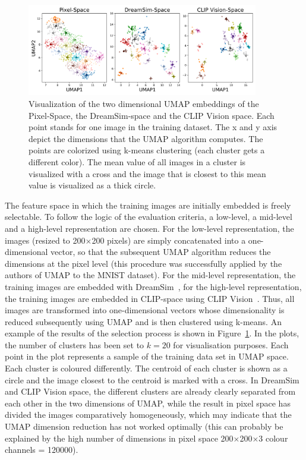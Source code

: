 \begin{figure}[ht]
    \centering
    \includegraphics[width=0.9\textwidth]{plots/dropout_umap.png}
    \caption[UMAP visualization of diversity based subsampling]{Visualization of the two dimensional UMAP embeddings of the Pixel-Space, the DreamSim-space and the CLIP Vision space. Each point stands for one image in the training dataset. The x and y axis depict the dimensions that the UMAP algorithm computes. The points are colorized using k-means clustering (each cluster gets a different color). The mean value of all images in a cluster is visualized with a cross and the image that is closest to this mean value is visualized as a thick circle.}\label{fig:dropout_umap}
\end{figure}


The feature space in which the training images are initially embedded is freely selectable. To follow the logic of the evaluation criteria, a low-level, a mid-level and a high-level representation are chosen. For the low-level representation, the images (resized to 200$\times$200 pixels) are simply concatenated into a one-dimensional vector, so that the subsequent UMAP algorithm reduces the dimensions at the pixel level (this procedure was successfully applied by the authors of UMAP to the MNIST dataset). For the mid-level representation, the training images are embedded with DreamSim~\cite{fuDreamSimLearningNew2023}, for the high-level representation, the training images are embedded in CLIP-space using CLIP Vision~\cite{radfordLearningTransferableVisual2021}. Thus, all images are transformed into one-dimensional vectors whose dimensionality is reduced subsequently using UMAP and is then clustered using k-means. 
An example of the results of the selection process is shown in Figure~\ref{fig:dropout_umap}. In the plots, the number of clusters has been set to $k=20$ for visualisation purposes. Each point in the plot represents a sample of the training data set in UMAP space. Each cluster is coloured differently. The centroid of each cluster is shown as a circle and the image closest to the centroid is marked with a cross. In DreamSim and CLIP Vision space, the different clusters are already clearly separated from each other in the two dimensions of UMAP, while the result in pixel space has divided the images comparatively homogeneously, which may indicate that the UMAP dimension reduction has not worked optimally (this can probably be explained by the high number of dimensions in pixel space 200$\times$200$\times$3 colour channels = 120000). 

